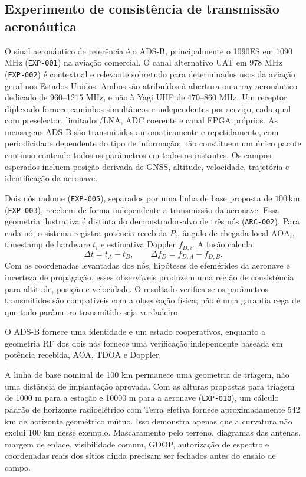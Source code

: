 \subsection*{Experimento de consistência de transmissão aeronáutica}
O sinal aeronáutico de referência é o ADS-B, principalmente o 1090ES em 1090 MHz (\texttt{EXP-001}) na aviação comercial. O canal alternativo UAT em 978 MHz (\texttt{EXP-002}) é contextual e relevante sobretudo para determinados usos da aviação geral nos Estados Unidos. Ambos são atribuídos à abertura ou array aeronáutico dedicado de 960--1215 MHz, e não à Yagi UHF de 470--860 MHz. Um receptor diplexado fornece caminhos simultâneos e independentes por serviço, cada qual com preselector, limitador/LNA, ADC coerente e canal FPGA próprios. As mensagens ADS-B são transmitidas automaticamente e repetidamente, com periodicidade dependente do tipo de informação; não constituem um único pacote contínuo contendo todos os parâmetros em todos os instantes. Os campos esperados incluem posição derivada de GNSS, altitude, velocidade, trajetória e identificação da aeronave.

Dois nós radome (\texttt{EXP-005}), separados por uma linha de base proposta de $100\,\mathrm{km}$ (\texttt{EXP-003}), recebem de forma independente a transmissão da aeronave. Essa geometria ilustrativa é distinta do demonstrador-alvo de três nós (\texttt{ARC-002}). Para cada nó, o sistema registra potência recebida $P_i$, ângulo de chegada local $\mathrm{AOA}_i$, timestamp de hardware $t_i$ e estimativa Doppler $f_{D,i}$. A fusão calcula:
\[
\Delta t=t_A-t_B,\qquad \Delta f_D=f_{D,A}-f_{D,B}.
\]
Com as coordenadas levantadas dos nós, hipóteses de efemérides da aeronave e incerteza de propagação, esses observáveis produzem uma região de consistência para altitude, posição e velocidade. O resultado verifica se os parâmetros transmitidos são compatíveis com a observação física; não é uma garantia cega de que todo parâmetro transmitido seja verdadeiro.

O ADS-B fornece uma identidade e um estado cooperativos, enquanto a geometria RF dos dois nós fornece uma verificação independente baseada em potência recebida, AOA, TDOA e Doppler.

A linha de base nominal de 100 km permanece uma geometria de triagem, não uma distância de implantação aprovada. Com as alturas propostas para triagem de 1000 m para a estação e 10000 m para a aeronave (\texttt{EXP-010}), um cálculo padrão de horizonte radioelétrico com Terra efetiva fornece aproximadamente 542 km de horizonte geométrico mútuo. Isso demonstra apenas que a curvatura não exclui 100 km nesse exemplo. Mascaramento pelo terreno, diagramas das antenas, margem de enlace, visibilidade comum, GDOP, autorização de espectro e coordenadas reais dos sítios ainda precisam ser fechados antes do ensaio de campo.

